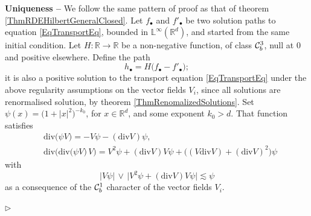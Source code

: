 \documentclass[11pt,a4paper]{amsart}
\newcommand{\RR}{\mathbb{R}}  \newcommand{\CC}{\mathbb{C}}  \newcommand{\LL}{\mathbb{L}}  \newcommand{\WW}{\mathbb{W}}
\newcommand{\ssk}{\smallskip}
\numberwithin{equation}{section} %
\newenvironment{Dem}{%
    \begin{list}{\hspace{0.5cm}{\sc Proof --}}{%
        \setlength{\topsep}{0pt}%
        \setlength{\leftmargin}{0pt}%
        \setlength{\rightmargin}{0pt}%
        \setlength{\listparindent}{0pt}%
        \setlength{\itemindent}{0pt}%
        \setlength{\parsep}{0pt}%
        \addtolength{\leftmargin}{20pt}%
        \addtolength{\rightmargin}{0pt}%
    } \item }{\hfill{\space $\rhd$}\end{list}\smallskip}
\begin{document}
\medskip

\begin{Dem}
{\bf Uniqueness --} We follow the same pattern of proof as that of theorem \ref{ThmRDEHilbertGeneralClosed}. Let $f_\bullet$ and $f'_\bullet$ be two solution paths to equation \eqref{EqTransportEq}, bounded in $\LL^\infty(\RR^d)$, and started from the same initial condition. Let $H : \RR\rightarrow\RR$ be a non-negative function, of class $\mathcal{C}^3_b$, null at $0$ and positive elsewhere. Define the path 
$$
h_\bullet = H\big(f_\bullet - f'_\bullet\big);
$$
it is also a positive solution to the transport equation \eqref{EqTransportEq} under the above regularity assumptions on the vector fields $V_i$, since all solutions are renormalised solution, by theorem \ref{ThmRenomalizedSolutions}. Set $\psi(x) = \big(1+|x|^2\big)^{-k_0}$, for $x\in\RR^d$, and some exponent $k_0>d$. That function satisfies 
\begin{equation*}
\begin{split}
&\textrm{div}\big(\psi V\big) = -V\psi - (\textrm{div}V)\psi, \\
&\textrm{div}\Big(\textrm{div}\big(\psi V\big)\,V\Big) = V^2\psi + (\textrm{div}V)V\psi + \big((V\textrm{div}V)+(\textrm{div}V)^2\big)\psi  
\end{split}
\end{equation*}
with 
\begin{equation*}
\Big|V\psi\Big| \,\vee\, \Big|V^2\psi + (\textrm{div}V)V\psi\Big| \lesssim \psi
\end{equation*}
as a consequence of the $\mathcal{C}^1_b$ character of the vector fields $V_i$. 

\ssk


\end{Dem}
\end{document}
